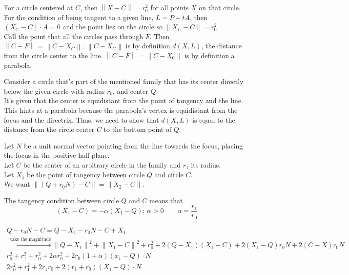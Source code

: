 \documentclass[twoside]{amsart}
\theoremstyle{plain}
\theoremstyle{definition}
\newcommand{\exercisehead}[1]
  {\smallskip
   \noindent{\small\bf Exercise #1.}}
\begin{document}
\exercisehead{21} For a circle centered at $C$, then $\left\| X - C \right\| = r_0^2$ for all points $X$ on that circle.  \medskip \\
For the condition of being tangent to a given line, $L = P +tA$, then $(X_C - C)\cdot A = 0 $ and the point lies on the circle so $\left\| X_C - C \right\| = r_0^2$.  \medskip \\
Call the point that all the circles pass through $F$.  Then $\left\| C - F \right\| = \left\| C - X_C \right\|$.  $\left\| C -X_C \right\|$ is by definition $d(X,L)$, the distance from the circle center to the line.  
$\left\| C - F \right\| = \left\| C - X_0 \right\|$ is by definition a parabola.  

\exercisehead{22}
Consider a circle that's part of the mentioned family that has its center directly below the given circle with radius $r_0$, and center $Q$.  \medskip \\
It's given that the center is equidistant from the point of tangency and the line.  This hints at a parabola because the parabola's vertex is equidistant from the focus and the directrix.  Thus, we need to show that $d(X,L)$ is equal to the distance from the circle center $C$ to the bottom point of $Q$.  

Let $N$ be a unit normal vector pointing from the line towards the focus, placing the focus in the positive half-plane.  \\
Let $C$ be the center of an arbitrary circle in the family and $r_1$ its radius.  \\
Let $X_1$ be the point of tangency between circle $Q$ and circle $C$.  \\
We want $\left\| (Q + r_0 N) - C \right\| = \left\| X_2 - C \right\|$.  

The tangency condition between circle $Q$ and $C$ means that
\[
(X_1 -C ) = - \alpha (X_1 - Q) ; \, \alpha > 0 \quad \quad \alpha = \frac{r_1}{r_0}
\]

\[
\begin{gathered}
  Q  - r_0 N -C = Q - X_1 - r_0 N - C + X_1 \\
  \xrightarrow{ \text{ take the magnitude} } \left\| Q - X_1 \right\|^2 + \left\| X_1 - C \right\|^2 + r_0^2 + 2(Q- X_1)(X_1 - C) + 2 (X_1 - Q) r_0 N + 2 (C-X)r_0 N \\
  r_0^2 + r_1^2 +r_0^2 + 2 \alpha r_0^2 + 2r_0 (1+\alpha)(x_1 - Q) \cdot N \\
  2r_0^2 + r_1^2 + 2r_1 r_0 + 2(r_1 + r_0)(X_1 - Q) \cdot N
\end{gathered}
\]
\end{document}
